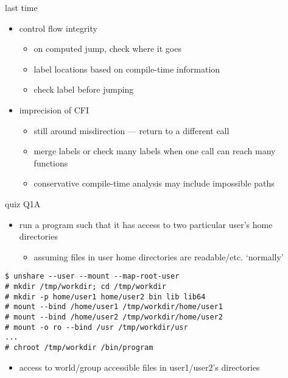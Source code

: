 \date{}
\title{}
\date{}
\usepackage[outputdir=latex.out]{minted}

\begin{frame}
    \titlepage
\end{frame}
\usetikzlibrary{calc}


\begin{frame}{last time}
    \begin{itemize}
    \item control flow integrity
        \begin{itemize}
        \item on computed jump, check where it goes
        \item label locations based on compile-time information
        \item check label before jumping
        \end{itemize}
    \item imprecision of CFI
        \begin{itemize}
        \item still around misdirection --- return to a different call
        \item merge labels or check many labels when one call can reach many functions
        \item conservative compile-time analysis may include impossible paths
        \end{itemize}
    \end{itemize}
\end{frame}

\begin{frame}[fragile]{quiz Q1A}
    \begin{itemize}
    \item run a program such that it has access to two particular user's home directories
        \begin{itemize}
        \item assuming files in user home directories are readable/etc. `normally'
        \end{itemize}
    \end{itemize}
\begin{Verbatim}[fontsize=\small]
$ unshare --user --mount --map-root-user
# mkdir /tmp/workdir; cd /tmp/workdir
# mkdir -p home/user1 home/user2 bin lib lib64
# mount --bind /home/user1 /tmp/workdir/home/user1
# mount --bind /home/user2 /tmp/workdir/home/user2
# mount -o ro --bind /usr /tmp/workdir/usr
...
# chroot /tmp/workdir /bin/program
\end{Verbatim}
    \begin{itemize}
    \item access to world/group accessible files in user1/user2's directories
    \end{itemize}
\end{frame}

